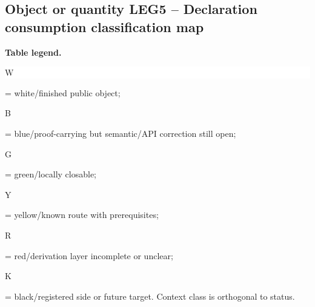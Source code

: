 \subsection*{Object or quantity LEG5 -- Declaration consumption classification map}
\hypertarget{objproof:LEG5}{}
\par\smallskip\noindent\begin{minipage}{0.99\linewidth}\footnotesize\raggedright\textbf{Table legend.} \colorbox{white}{\strut W} = white/finished public object; \colorbox{cyan!20}{\strut B} = blue/proof-carrying but semantic/API correction still open; \colorbox{green!18}{\strut G} = green/locally closable; \colorbox{yellow!25}{\strut Y} = yellow/known route with prerequisites; \colorbox{red!20}{\strut R} = red/derivation layer incomplete or unclear; \colorbox{black!18}{\strut K} = black/registered side or future target. Context class is orthogonal to status.\end{minipage}\par\vspace{0.25em}
